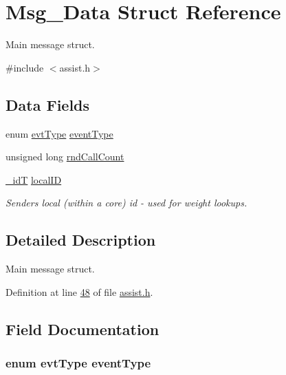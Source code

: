\hypertarget{struct_msg___data}{}\section{Msg\+\_\+\+Data Struct Reference}
\label{struct_msg___data}


Main message struct.  




{\ttfamily \#include $<$assist.\+h$>$}

\subsection*{Data Fields}
\begin{DoxyCompactItemize}
\item 
enum \hyperlink{assist_8h_a7c1688de451e0dea1e11617bce3ec450}{evt\+Type} \hyperlink{struct_msg___data_a015b6eb45982e1842ee8fc389a099ced}{event\+Type}
\item 
unsigned long \hyperlink{struct_msg___data_a2e49a6bcc6c45ade722f746b1ea707f2}{rnd\+Call\+Count}
\item 
\hyperlink{assist_8h_a3f7a6e6a1210b6d9d7a42177dcb9634b}{\+\_\+id\+T} \hyperlink{struct_msg___data_aefc820e92a74047ec7ed74c1c45f818f}{local\+I\+D}
\begin{DoxyCompactList}\small\item\em Sender\textquotesingle{}s local (within a core) id -\/ used for weight lookups. \end{DoxyCompactList}\end{DoxyCompactItemize}


\subsection{Detailed Description}
Main message struct. 

Definition at line \hyperlink{assist_8h_source_l00048}{48} of file \hyperlink{assist_8h_source}{assist.\+h}.



\subsection{Field Documentation}
\hypertarget{struct_msg___data_a015b6eb45982e1842ee8fc389a099ced}{}
\subsubsection[{event\+Type}]{\setlength{\rightskip}{0pt plus 5cm}enum {\bf evt\+Type} event\+Type}\label{struct_msg___data_a015b6eb45982e1842ee8fc389a099ced}


